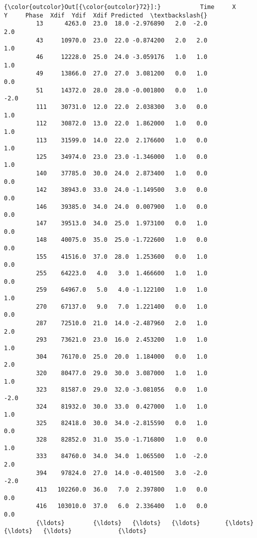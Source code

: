 \documentclass[11pt]{article}
\begin{document}
\begin{Verbatim}[commandchars=\\\{\}]
{\color{outcolor}Out[{\color{outcolor}72}]:}           Time     X     Y     Phase  Xdif  Ydif  Xdif Predicted  \textbackslash{}
         13      4263.0  23.0  18.0 -2.976890   2.0  -2.0             2.0   
         43     10970.0  23.0  22.0 -0.874200   2.0   2.0             1.0   
         46     12228.0  25.0  24.0 -3.059176   1.0   1.0             1.0   
         49     13866.0  27.0  27.0  3.081200   0.0   1.0             0.0   
         51     14372.0  28.0  28.0 -0.001800   0.0   1.0            -2.0   
         111    30731.0  12.0  22.0  2.038300   3.0   0.0             1.0   
         112    30872.0  13.0  22.0  1.862000   1.0   0.0             1.0   
         113    31599.0  14.0  22.0  2.176600   1.0   0.0             1.0   
         125    34974.0  23.0  23.0 -1.346000   1.0   0.0             1.0   
         140    37785.0  30.0  24.0  2.873400   1.0   0.0             0.0   
         142    38943.0  33.0  24.0 -1.149500   3.0   0.0             0.0   
         146    39385.0  34.0  24.0  0.007900   1.0   0.0             0.0   
         147    39513.0  34.0  25.0  1.973100   0.0   1.0             0.0   
         148    40075.0  35.0  25.0 -1.722600   1.0   0.0             0.0   
         155    41516.0  37.0  28.0  1.253600   0.0   1.0             0.0   
         255    64223.0   4.0   3.0  1.466600   1.0   1.0             0.0   
         259    64967.0   5.0   4.0 -1.122100   1.0   1.0             1.0   
         270    67137.0   9.0   7.0  1.221400   0.0   1.0             0.0   
         287    72510.0  21.0  14.0 -2.487960   2.0   1.0             2.0   
         293    73621.0  23.0  16.0  2.453200   1.0   1.0             1.0   
         304    76170.0  25.0  20.0  1.184000   0.0   1.0             2.0   
         320    80477.0  29.0  30.0  3.087000   1.0   1.0             1.0   
         323    81587.0  29.0  32.0 -3.081056   0.0   1.0            -2.0   
         324    81932.0  30.0  33.0  0.427000   1.0   1.0             1.0   
         325    82418.0  30.0  34.0 -2.815590   0.0   1.0             0.0   
         328    82852.0  31.0  35.0 -1.716800   1.0   0.0             1.0   
         333    84760.0  34.0  34.0  1.065500   1.0  -2.0             2.0   
         394    97824.0  27.0  14.0 -0.401500   3.0  -2.0            -2.0   
         413   102260.0  36.0   7.0  2.397800   1.0   0.0             0.0   
         416   103010.0  37.0   6.0  2.336400   1.0   0.0             0.0   
         {\ldots}        {\ldots}   {\ldots}   {\ldots}       {\ldots}   {\ldots}   {\ldots}             {\ldots}   

\end{Verbatim}
\end{document}
